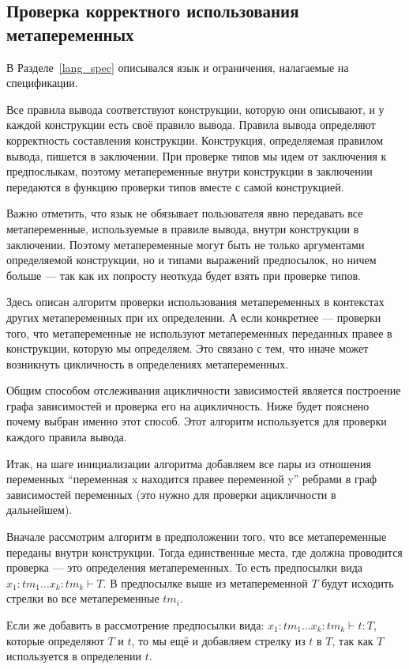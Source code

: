 \subsection{Проверка корректного использования метапеременных}\label{toposort}
В Разделе~\ref{lang_spec} описывался язык и ограничения, налагаемые на спецификации.

Все правила вывода соответствуют конструкции, которую они описывают, и у каждой конструкции есть своё правило вывода. Правила вывода определяют корректность составления конструкции. Конструкция, определяемая правилом вывода, пишется в заключении. При проверке типов мы идем от заключения к предпослыкам, поэтому метапеременные внутри конструкции в заключении передаются в функцию проверки типов вместе с самой конструкцией.

Важно отметить, что язык не обязывает пользователя явно передавать все метапеременные, используемые в правиле вывода, внутри конструкции в заключении. Поэтому метапеременные могут быть не только аргументами определяемой конструкции, но и типами выражений предпосылок, но ничем больше --- так как их попросту неоткуда будет взять при проверке типов.

Здесь описан алгоритм проверки использования метапеременных в контекстах других метапеременных при их определении. А если конкретнее --- проверки того, что метапеременные не используют метапеременных переданных правее в конструкции, которую мы определяем. Это связано с тем, что иначе может возникнуть цикличность в определениях метапеременных.

Общим способом отслеживания ацикличности зависимостей является построение графа зависимостей и проверка его на ацикличность. Ниже будет пояснено почему выбран именно этот способ. Этот алгоритм используется для проверки каждого правила вывода.

Итак, на шаге инициализации алгоритма добавляем все пары из отношения переменных ``переменная x находится правее переменной y'' ребрами в граф зависимостей переменных (это нужно для проверки ацикличности в дальнейшем).

Вначале рассмотрим алгоритм в предположении того, что все метапеременные переданы внутри конструкции.
Тогда единственные места, где должна проводится проверка --- это определения метапеременных. То есть предпосылки вида $x_1 : tm_1 \ldots x_k : tm_k  \vdash T$. В предпосылке выше из метапеременной $T$ будут исходить стрелки во все метапеременные $tm_i$.

Если же добавить в рассмотрение предпосылки вида: $x_1 : tm_1 \ldots x_k : tm_k  \vdash t : T$, которые определяют $T$ и $t$, то мы ещё и добавляем стрелку из $t$ в $T$, так как $T$ используется в определении $t$.

